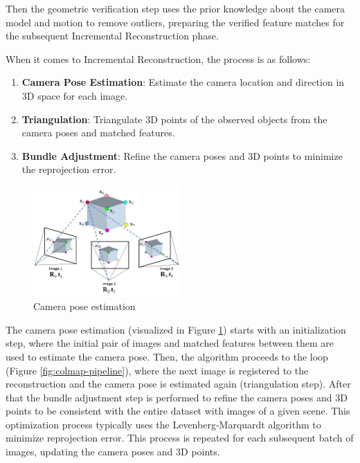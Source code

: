 Then the geometric verification step uses the prior knowledge about
the camera model and motion to remove outliers, preparing the
verified feature matches for the subsequent Incremental Reconstruction phase.

When it comes to Incremental Reconstruction, the process is as follows:
\begin{enumerate}
  \item \textbf{Camera Pose Estimation}: Estimate the camera location
    and direction in 3D space for each image.
  \item \textbf{Triangulation}: Triangulate 3D points of the observed
    objects from the camera poses and matched features.
  \item \textbf{Bundle Adjustment}: Refine the camera poses and 3D
    points to minimize the reprojection error.
\end{enumerate}

\begin{figure}[h]
  \centering
  \includegraphics[width=0.5\textwidth]{images/related-work/Structure-from-Motion-SfM-process-is-illustrated-The-structure-in-the.png}
  \caption{Camera pose estimation}
  \label{fig:camera-pose-estimation}
\end{figure}

The camera pose estimation (visualized in Figure
\ref{fig:camera-pose-estimation}) starts with an initialization step,
where the initial pair of images and matched features between them
are used to estimate the camera pose. Then, the algorithm proceeds to
the loop (Figure \ref{fig:colmap-pipeline}), where the next image is
registered to the reconstruction and the camera pose is estimated
again (triangulation step). After that the bundle adjustment step is
performed to refine the camera poses and 3D points to be consistent
with the entire dataset with images of a given scene. This
optimization process typically uses the Levenberg-Marquardt algorithm
to minimize reprojection error. This process is repeated for each
subsequent batch of images, updating the camera poses and 3D points.

